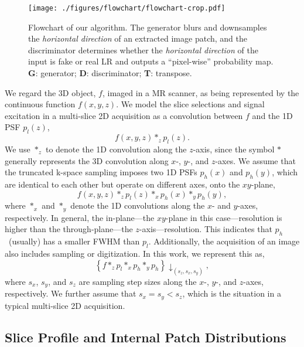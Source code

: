 \documentclass[runningheads]{llncs}
\begin{document}
\begin{figure}[t]
    \centering
    \texttt{[image: ./figures/flowchart/flowchart-crop.pdf]}
    \caption{Flowchart of our algorithm. The generator blurs and
    downsamples the \textit{horizontal direction} of an extracted
    image patch, and the discriminator determines whether the
    \textit{horizontal direction} of the input is fake or real LR and
    outputs a ``pixel-wise'' probability map. \textbf{G}: generator;
    \textbf{D}: discriminator; \textbf{T}: transpose.}
    \label{fig:flowchart}
\end{figure}
%
We regard the 3D object, $f$, imaged in a MR scanner, as being
represented by the continuous function $f(x, y, z)$. We model the
slice selections and signal excitation in a multi-slice 2D acquisition
as a convolution between $f$ and the 1D PSF $p_l(z)$,
%
\begin{equation*}
%
f(x, y, z) \ast_z p_l(z).
%
\end{equation*}
%
We use $\ast_z$ to denote the 1D convolution along the $z$-axis, since
the symbol $\ast$ generally represents the 3D convolution along $x$-,
$y$-, and $z$-axes. We assume that the truncated k-space sampling
imposes two 1D PSFs $p_h(x)$ and $p_h(y)$, which are identical to each
other but operate on different axes, onto the $xy$-plane,
%
\begin{equation*}
%
f(x, y, z) \ast_z p_l(z) \ast_x p_h(x) \ast_y p_h(y),
%
\end{equation*}
%
where $\ast_x$ and $\ast_y$ denote the 1D convolutions along the $x$-
and $y$-axes, respectively. In general, the in-plane---the $xy$-plane
in this case---resolution is higher than the through-plane---the
$z$-axis---resolution. This indicates that $p_h$~(usually) has a
smaller FWHM than $p_l$. Additionally, the acquisition of an image
also includes sampling or digitization. In this work, we
represent this as,
%
\begin{equation}
%
\left \{ f \ast_z p_l \ast_x p_h \ast_y p_h \right \}
\downarrow_{(s_z, s_x, s_y)},
%
\label{e:image}
%
\end{equation}
%
where $s_x$, $s_y$, and $s_z$ are sampling step sizes along the $x$-,
$y$-,
and $z$-axes, respectively. We further assume that $s_x = s_y < s_z$,
which is the situation in a typical multi-slice 2D acquisition.

\subsection{Slice Profile and Internal Patch Distributions}
\label{sec:patch}
\end{document}
